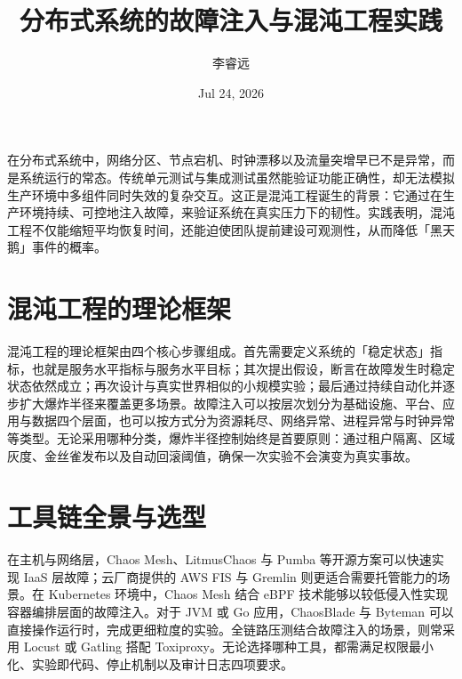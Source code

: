 \title{分布式系统的故障注入与混沌工程实践}
\author{李睿远}
\date{Jul 24, 2026}
\maketitle
在分布式系统中，网络分区、节点宕机、时钟漂移以及流量突增早已不是异常，而是系统运行的常态。传统单元测试与集成测试虽然能验证功能正确性，却无法模拟生产环境中多组件同时失效的复杂交互。这正是混沌工程诞生的背景：它通过在生产环境持续、可控地注入故障，来验证系统在真实压力下的韧性。实践表明，混沌工程不仅能缩短平均恢复时间，还能迫使团队提前建设可观测性，从而降低「黑天鹅」事件的概率。\par
\chapter{混沌工程的理论框架}
混沌工程的理论框架由四个核心步骤组成。首先需要定义系统的「稳定状态」指标，也就是服务水平指标与服务水平目标；其次提出假设，断言在故障发生时稳定状态依然成立；再次设计与真实世界相似的小规模实验；最后通过持续自动化并逐步扩大爆炸半径来覆盖更多场景。故障注入可以按层次划分为基础设施、平台、应用与数据四个层面，也可以按方式分为资源耗尽、网络异常、进程异常与时钟异常等类型。无论采用哪种分类，爆炸半径控制始终是首要原则：通过租户隔离、区域灰度、金丝雀发布以及自动回滚阈值，确保一次实验不会演变为真实事故。\par
\chapter{工具链全景与选型}
在主机与网络层，Chaos Mesh、LitmusChaos 与 Pumba 等开源方案可以快速实现 IaaS 层故障；云厂商提供的 AWS FIS 与 Gremlin 则更适合需要托管能力的场景。在 Kubernetes 环境中，Chaos Mesh 结合 eBPF 技术能够以较低侵入性实现容器编排层面的故障注入。对于 JVM 或 Go 应用，ChaosBlade 与 Byteman 可以直接操作运行时，完成更细粒度的实验。全链路压测结合故障注入的场景，则常采用 Locust 或 Gatling 搭配 Toxiproxy。无论选择哪种工具，都需满足权限最小化、实验即代码、停止机制以及审计日志四项要求。\par
